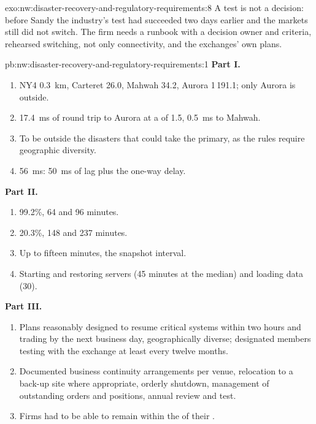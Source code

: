 \begin{solution}{exo:nw:disaster-recovery-and-regulatory-requirements:8}
A test is not a decision: before Sandy the industry's test had succeeded two days earlier and the markets still did not switch. The firm
needs a runbook with a decision owner and criteria, rehearsed switching, not only connectivity, and the exchanges' own plans.
\end{solution}

\begin{solution}{pb:nw:disaster-recovery-and-regulatory-requirements:1}
\textbf{Part I.}
\begin{enumerate}
\item NY4 \qty{0.3}{\kilo\metre}, Carteret 26.0, Mahwah 34.2, Aurora 1\,191.1; only Aurora is outside.
\item \qty{17.4}{\milli\second} of round trip to Aurora at a  of 1.5, \qty{0.5}{\milli\second} to Mahwah.
\item To be outside the disasters that could take the primary, as the rules require geographic diversity.
\item \qty{56}{\milli\second}: \qty{50}{\milli\second} of lag plus the one-way delay.
\end{enumerate}
\textbf{Part II.}
\begin{enumerate}[resume]
\item 99.2\%, 64 and 96 minutes.
\item 20.3\%, 148 and 237 minutes.
\item Up to fifteen minutes, the snapshot interval.
\item Starting and restoring servers (45 minutes at the median) and loading data (30).
\end{enumerate}
\textbf{Part III.}
\begin{enumerate}[resume]
\item Plans reasonably designed to resume critical systems within two hours and trading by the next business day, geographically diverse;
  designated members testing with the exchange at least every twelve months.
\item Documented business continuity arrangements per venue, relocation to a back-up site where appropriate, orderly shutdown, management of
  outstanding orders and positions, annual review and test.
\item Firms had to be able to remain within the  of their .

\end{enumerate}
\end{solution}
